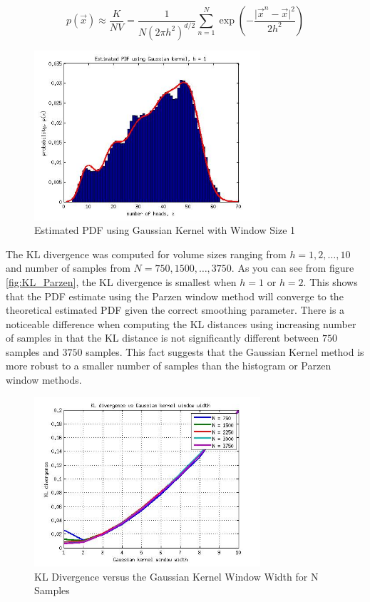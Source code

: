 \documentclass[journal]{IEEEtran}
\begin{document}
\begin{equation}
\label{eq:gaussKernel}
p(\vec{x}) \approx \frac{K}{N V} = \frac{1}{N (2\pi h^2)^{d/2}}\sum_{n=1}^{N}{\exp\left(- \frac{\lvert\vec{x}^n-\vec{x}\rvert^2}{2h^2}\right)}
\end{equation}

\begin{figure}[h]
\centering
\includegraphics[width=3.3in]{../images/PDF_GaussianKernel.jpg}
\caption{Estimated PDF using Gaussian Kernel with Window Size 1}
\label{fig:PDF_GaussianKernel}
\end{figure}

\par The KL divergence was computed for volume sizes ranging from \(h = 1, 2, \ldots, 10\) and number of samples from \(N = 750, 1500,\ldots, 3750\). As you can see from figure \ref{fig:KL_Parzen}, the KL divergence is smallest when \(h = 1\) or \(h = 2\). This shows that the PDF estimate using the Parzen window method will converge to the theoretical estimated PDF given the correct smoothing parameter. There is a noticeable difference when computing the KL distances using increasing number of samples in that the KL distance is not significantly different between \(750\) samples and \(3750\) samples. This fact suggests that the Gaussian Kernel method is more robust to a smaller number of samples than the histogram or Parzen window methods.

\begin{figure}[h]
\centering
\includegraphics[width=3.3in]{../images/KL_GaussianKernel.jpg}
\caption{KL Divergence versus the Gaussian Kernel Window Width for N Samples}
\label{fig:KL_GaussianKernel}
\end{figure}
\end{document}
